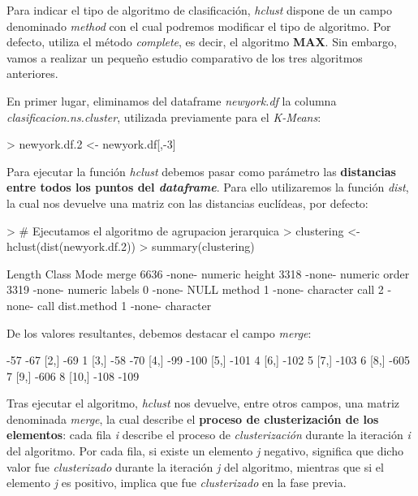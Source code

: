 \documentclass [a4paper] {article}
\begin{document}
Para indicar el tipo de algoritmo de clasificación, \textit{hclust} dispone de un campo denominado \textit{method} con el cual podremos modificar el tipo de algoritmo. Por defecto, utiliza el método \textit{complete}, es decir, el algoritmo \textbf{MAX}. Sin embargo, vamos a realizar un pequeño estudio comparativo de los tres algoritmos anteriores.

En primer lugar, eliminamos del dataframe \textit{newyork.df} la columna \textit{clasificacion.ns.cluster}, utilizada previamente para el \textit{K-Means}:

\begin{Schunk}
\begin{Sinput}
> newyork.df.2 <- newyork.df[,-3]
\end{Sinput}
\end{Schunk}

Para ejecutar la función \textit{hclust} debemos pasar como parámetro las \textbf{distancias entre todos los puntos del \textit{dataframe}}. Para ello utilizaremos la función \textit{dist}, la cual nos devuelve una matriz con las distancias euclídeas, por defecto:

\begin{Schunk}
\begin{Sinput}
> # Ejecutamos el algoritmo de agrupacion jerarquica
> clustering <- hclust(dist(newyork.df.2))
> summary(clustering)
\end{Sinput}
\begin{Soutput}
            Length Class  Mode     
merge       6636   -none- numeric  
height      3318   -none- numeric  
order       3319   -none- numeric  
labels         0   -none- NULL     
method         1   -none- character
call           2   -none- call     
dist.method    1   -none- character
\end{Soutput}
\end{Schunk}
\newpage
De los valores resultantes, debemos destacar el campo \textit{merge}:
\begin{Schunk}
\begin{Soutput}
      [,1] [,2]
 [1,]  -57  -67
 [2,]  -69    1
 [3,]  -58  -70
 [4,]  -99 -100
 [5,] -101    4
 [6,] -102    5
 [7,] -103    6
 [8,] -605    7
 [9,] -606    8
[10,] -108 -109
\end{Soutput}
\end{Schunk}

Tras ejecutar el algoritmo, \textit{hclust} nos devuelve, entre otros campos, una matriz denominada \textit{merge}, la cual describe el \textbf{proceso de clusterización de los elementos}: cada fila \textit{i} describe el proceso de \textit{clusterización} durante la iteración \textit{i} del algoritmo. Por cada fila, si existe un elemento \textit{j} negativo, significa que dicho valor fue \textit{clusterizado} durante la iteración \textit{j} del algoritmo, mientras que si el elemento \textit{j} es positivo, implica que fue \textit{clusterizado} en la fase previa.
\end{document}

